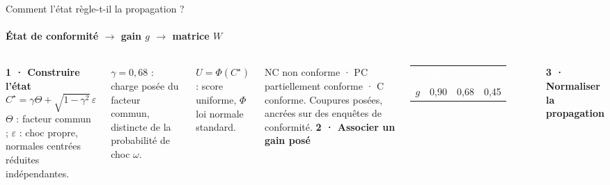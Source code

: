 \documentclass[aspectratio=169,10pt,t]{beamer}
\renewcommand{\arraystretch}{1.25}
\begin{document}
\begin{frame}{Comment l'état règle-t-il la propagation ?}
  \framesubtitle{\ajout État de conformité $\longrightarrow$ gain $g$ $\longrightarrow$ matrice $W$}
  \begin{columns}[T,onlytextwidth]
  \small
  \textbf{1 · Construire l'état}
  \[C^\star=\gamma\Theta+\sqrt{1-\gamma^2}\,\varepsilon\]
  $\Theta$ : facteur commun ; $\varepsilon$ : choc propre, normales centrées réduites indépendantes.\par\vspace{.5mm}
  $\gamma=0{,}68$ : charge posée du facteur commun, distincte de la probabilité de choc $\omega$.\par\vspace{.5mm}
  $U=\Phi(C^\star)$ : score uniforme, $\Phi$ loi normale standard.\par\vspace{2mm}
  \centering
  \par\vspace{1.5mm}
  {\footnotesize NC non conforme · PC partiellement conforme · C conforme. Coupures posées, ancrées sur des enquêtes de conformité.}
  \small
  \textbf{2 · Associer un gain posé}\par\vspace{2mm}
  \centering
  \renewcommand{\arraystretch}{1.4}
  \setlength{\tabcolsep}{4mm}
  \begin{tabular}{@{}l ccc@{}}
    & \cellcolor{accent}\textcolor{white}{\bfseries NC} & \cellcolor{acier}\textcolor{white}{\bfseries PC}
      & \cellcolor{nexialog}\textcolor{white}{\bfseries C} \\
    $g$ & \cellcolor{clair}0,90 & \cellcolor{clair}0,68 & \cellcolor{clair}0,45 \\
  \end{tabular}\par\vspace{4mm}
  \raggedright
  \textbf{3 · Normaliser la propagation}\par\vspace{1.5mm}

\end{columns}
\end{frame}
\end{document}
